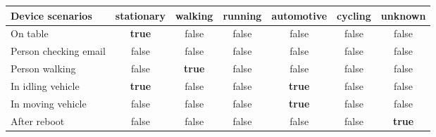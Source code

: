 \begin{tabular}{l|c|ccccc}
Device scenarios & stationary & walking & running & automotive & cycling & unknown \\
\hline
On table & \textbf{true} & false & false & false & false & false\\
Person checking email & false & false & false & false & false & false\\
Person walking & false & \textbf{true} & false & false & false & false\\
In idling vehicle & \textbf{true} & false & false & \textbf{true} & false & false\\
In moving vehicle & false & false & false & \textbf{true} & false & false\\
After reboot & false & false & false & false & false & \textbf{true}
\end{tabular}
